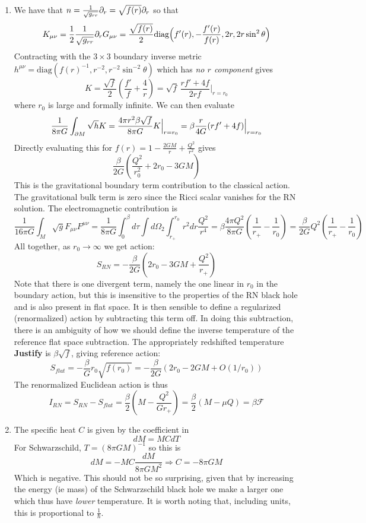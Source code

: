 \documentclass[11pt, class=article, crop=false]{standalone}
\begin{document}
\begin{enumerate}
	\item We have that $n = \frac{1}{\sqrt{g_{rr}}} \partial_r = \sqrt{f(r)} \partial_r$ so that
	\[
		K_{\mu \nu} = \frac12  \frac{1}{\sqrt{g_{rr}}} \partial_r G_{\mu \nu} = \frac{\sqrt{f(r)}}{2} \text{diag}\Big(f'(r), -\frac{f'(r)}{f(r)}, 2r, 2r \sin^2 \theta \Big)
	\]
	Contracting with the $3 \times 3$ boundary inverse metric $h^{\mu \nu} = \text{diag}(f(r)^{-1}, r^{-2}, r^{-2} \sin^{-2} \theta)$ which has \emph{no $r$ component} gives
	\[
		K =  \frac{\sqrt{f}}{2} \left(\frac{f'}{f} + \frac{4}{r} \right) = \sqrt{f} \, \frac{r f' + 4 f}{2 r f} \Big|_{r = r_0}
	\]
	where $r_0$ is large and formally infinite. We can then evaluate 
	\[
		\frac{1}{8 \pi G} \int_{\partial M} \sqrt{h} K = \frac{4 \pi r^2 \beta \sqrt{f}}{8 \pi G} K\Big|_{r=r_0} = \beta \frac{r}{4G} (r f' + 4 f)\Big|_{r=r_0} 
	\]
	Directly evaluating this for $f(r) = 1 - \frac{2 G M}{r} + \frac{Q^2}{r^2}$ gives
	\[
		\frac{\beta}{2 G} \left(\frac{Q^2}{r_0^2} + 2 r_0 - 3 G M \right)
	\]
	This is the gravitational boundary term contribution to the classical action. 
	 The gravitational bulk term is zero since the Ricci scalar vanishes for the RN solution. The electromagnetic contribution is
	\[
		\frac{1}{16 \pi G} \int_M \sqrt{g} F_{\mu \nu} F^{\mu \nu} = \frac{1}{8 \pi G} \int_0^\beta d\tau \int d\Omega_2 \int_{r_+}^{r_0} r^2 dr \frac{Q^2}{r^4} = \beta \frac{4 \pi Q^2}{8 \pi G} \left(\frac{1}{r_+} - \frac{1}{r_0} \right) = \frac{\beta}{2G} Q^2 \left(\frac{1}{r_+} - \frac{1}{r_0}\right)
	\]
	All together, as $r_0 \to \infty$ we get action:
	\[
		S_{RN} = -\frac{\beta}{2G} \left(2 r_0 - 3 G M + \frac{Q^2}{r_+} \right)
	\]
	Note that there is one divergent term, namely the one linear in $r_0$ in the boundary action, but this is insensitive to the properties of the RN black hole and is also present in flat space. It is then sensible to define a regularized (renormalized) action by subtracting this term off. In doing this subtraction, there is an ambiguity of how we should define the inverse temperature of the reference flat space subtraction. The appropriately redshifted temperature \textbf{Justify} is $\beta \sqrt{f}$, giving reference action:
		\[
			S_{flat} =  -\frac{\beta}{G} r_0 \sqrt{f(r_0)} = - \frac{\beta}{2G} (2 r_0 - 2 G M + O(1/r_0))
		\]
	The renormalized Euclidean action is thus 
	\[
		I_{RN} = S_{RN} - S_{flat} = \frac{\beta}{2} (M - \frac{Q^2}{G r_+}) = \frac{\beta}{2} (M -  \mu Q) = \beta \mathcal F
	\]
	\item The specific heat $C$ is given by the coefficient in
	\[
		dM = M C dT
	\]
	For Schwarzschild, $T = (8 \pi G M)^{-1}$ so this is 
	\[
		dM = - M C \frac{dM}{8 \pi G M^2} \Rightarrow C = -8 \pi G M
	\]
	Which is negative. This should not be so surprising, given that by increasing the energy (ie mass) of the Schwarzschild black hole we make a larger one which thus have \emph{lower} temperature. It is worth noting that, including units, this is proportional to $\frac1\hbar$.
	

\end{enumerate}
\end{document}
